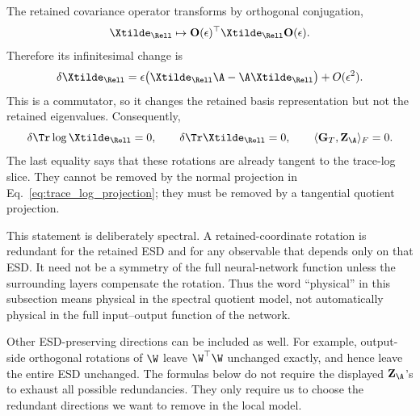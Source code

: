 The retained covariance operator transforms by orthogonal conjugation,
\begin{equation}
  \Xtilde_{\Rell}
  \mapsto
  \mathbf O(\epsilon)^\top\Xtilde_{\Rell}\mathbf O(\epsilon).
  \label{eq:X_rotation_conjugation}
\end{equation}
Therefore its infinitesimal change is
\begin{equation}
  \delta\Xtilde_{\Rell}
  =
  \epsilon\big(\Xtilde_{\Rell}\A-\A\Xtilde_{\Rell}\big)
  +O(\epsilon^2).
  \label{eq:X_commutator_rotation}
\end{equation}
This is a commutator, so it changes the retained basis representation but not the retained eigenvalues.  Consequently,
\begin{equation}
  \delta\Tr\log\Xtilde_{\Rell}=0,
  \qquad
  \delta\Tr\Xtilde_{\Rell}=0,
  \qquad
  \langle\mathbf G_T,\mathbf Z_{\A}\rangle_F=0.
  \label{eq:rotation_invariants}
\end{equation}
The last equality says that these rotations are already tangent to the trace-log slice.  They cannot be removed by the normal projection in Eq.~\eqref{eq:trace_log_projection}; they must be removed by a tangential quotient projection.

This statement is deliberately spectral.  A retained-coordinate rotation is redundant for the retained ESD and for any observable that depends only on that ESD.  It need not be a symmetry of the full neural-network function unless the surrounding layers compensate the rotation.  Thus the word ``physical'' in this subsection means physical in the spectral quotient model, not automatically physical in the full input--output function of the network.

Other ESD-preserving directions can be included as well.  For example, output-side orthogonal rotations of \(\W\) leave \(\W^\top\W\) unchanged exactly, and hence leave the entire ESD unchanged.  The formulas below do not require the displayed \(\mathbf Z_{\A}\)'s to exhaust all possible redundancies.  They only require us to choose the redundant directions we want to remove in the local model.

